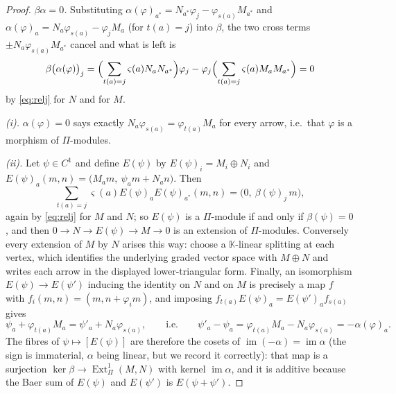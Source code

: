 \documentclass[reqno]{amsart}
\theoremstyle{plain}
\theoremstyle{definition}
\DeclareMathOperator{\Ext}{Ext}
\DeclareMathOperator{\im}{im}
\newcommand{\al}{\alpha}
\newcommand{\Pia}{\Pi}
\begin{document}
\begin{proof}
\emph{$\beta\al=0$.}  Substituting
$\al(\varphi)_{a^{*}}=N_{a^{*}}\varphi_j-\varphi_{s(a)}M_{a^{*}}$ and
$\al(\varphi)_a=N_a\varphi_{s(a)}-\varphi_jM_a$ (for $t(a)=j$) into $\beta$,
the two cross terms $\pm N_a\varphi_{s(a)}M_{a^{*}}$ cancel and what is left is
\[
   \beta\bigl(\al(\varphi)\bigr)_j
   =\Bigl(\sum_{t(a)=j}\varsigma(a)N_aN_{a^{*}}\Bigr)\varphi_j
   -\varphi_j\Bigl(\sum_{t(a)=j}\varsigma(a)M_aM_{a^{*}}\Bigr)=0
\]
by \eqref{eq:relj} for $N$ and for $M$.

\emph{(i).}  $\al(\varphi)=0$ says exactly $N_a\varphi_{s(a)}=\varphi_{t(a)}M_a$
for every arrow, i.e.\ that $\varphi$ is a morphism of $\Pia$-modules.

\emph{(ii).}  Let $\psi\in C^1$ and define $E(\psi)$ by
$E(\psi)_i=M_i\oplus N_i$ and
$E(\psi)_a(m,n)=\bigl(M_am,\ \psi_am+N_an\bigr)$.  Then
\[
   \sum_{t(a)=j}\varsigma(a)E(\psi)_aE(\psi)_{a^{*}}(m,n)
   =\bigl(0,\ \beta(\psi)_j\,m\bigr),
\]
again by \eqref{eq:relj} for $M$ and $N$; so $E(\psi)$ is a $\Pia$-module if
and only if $\beta(\psi)=0$, and then
$0\to N\to E(\psi)\to M\to0$ is an extension of $\Pia$-modules.  Conversely
every extension of $M$ by $N$ arises this way: choose a $\mathbb{K}$-linear
splitting at each vertex, which identifies the underlying graded vector space
with $M\oplus N$ and writes each arrow in the displayed lower-triangular form.
Finally, an isomorphism $E(\psi)\to E(\psi')$ inducing the identity on $N$ and
on $M$ is precisely a map $f$ with $f_i(m,n)=(m,n+\varphi_{i}m)$, and imposing
$f_{t(a)}E(\psi)_a=E(\psi')_af_{s(a)}$ gives
\[
   \psi_a+\varphi_{t(a)}M_a=\psi'_a+N_a\varphi_{s(a)},
   \qquad\text{i.e.}\qquad
   \psi'_a-\psi_a=\varphi_{t(a)}M_a-N_a\varphi_{s(a)}=-\al(\varphi)_a .
\]
The fibres of $\psi\mapsto[E(\psi)]$ are therefore the cosets of
$\im(-\al)=\im\al$ \textup{(}the sign is immaterial, $\al$ being linear, but we
record it correctly\textup{)}: that map is a surjection
$\ker\beta\to\Ext^1_\Pia(M,N)$ with
kernel $\im\al$, and it is additive because the Baer sum of $E(\psi)$ and
$E(\psi')$ is $E(\psi+\psi')$.


\end{proof}
\end{document}
